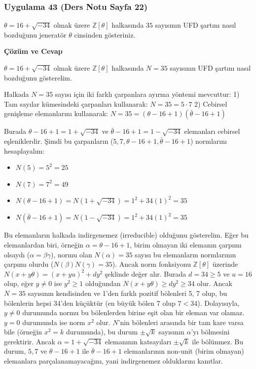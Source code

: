 \documentclass[11pt, a4paper]{article}
\newenvironment{cozum}{
    \vspace{0.5cm}
    \noindent\textcolor{green!60!black}{\faCheckCircle\enspace \textbf{\Large Çözüm ve Cevap}}\par\vspace{0.2cm}
}{}
\begin{document}
\subsubsection{Uygulama 43 (Ders Notu Sayfa 22)}
\begin{sorubox}
$\theta = 16 + \sqrt{-34}$ olmak üzere $\mathbb{Z}[\theta]$ halkasında $35$ sayısının UFD şartını nasıl bozduğunu jeneratör $\theta$ cinsinden gösteriniz.
\end{sorubox}
\begin{cozum}
$\theta = 16 + \sqrt{-34}$ olmak üzere $\mathbb{Z}[\theta]$ halkasında $N = 35$ sayısının UFD şartını nasıl bozduğunu gösterelim.

Halkada $N = 35$ sayısı için iki farklı çarpanlara ayırma yöntemi mevcuttur:
1) Tam sayılar kümesindeki çarpanları kullanarak: $N = 35 = 5 \cdot 7$
2) Cebirsel genişleme elemanlarını kullanarak: $N = 35 = (\theta - 16 + 1)(\bar{\theta} - 16 + 1)$

Burada $\theta - 16 + 1 = 1 + \sqrt{-34}$ ve $\bar{\theta} - 16 + 1 = 1 - \sqrt{-34}$ elemanları cebirsel eşleniklerdir. Şimdi bu çarpanların ($5, 7, \theta - 16 + 1, \bar{\theta} - 16 + 1$) normlarını hesaplayalım:
\begin{itemize}
    \item $N(5) = 5^2 = 25$
    \item $N(7) = 7^2 = 49$
    \item $N(\theta - 16 + 1) = N(1 + \sqrt{-34}) = 1^2 + 34(1)^2 = 35$
    \item $N(\bar{\theta} - 16 + 1) = N(1 - \sqrt{-34}) = 1^2 + 34(1)^2 = 35$
\end{itemize}

Bu elemanların halkada indirgenemez (irreducible) olduğunu gösterelim. Eğer bu elemanlardan biri, örneğin $\alpha = \theta - 16 + 1$, birim olmayan iki elemanın çarpımı olsaydı ($\alpha = \beta \gamma$), normu olan $N(\alpha) = 35$ sayısı bu elemanların normlarının çarpımı olurdu ($N(\beta)N(\gamma) = 35$). Ancak norm fonksiyonu $\mathbb{Z}[\theta]$ üzerinde $N(x+y\theta) = (x+yu)^2 + dy^2$ şeklinde değer alır. Burada $d = 34 \ge 5$ ve $u = 16$ olup, eğer $y \neq 0$ ise $y^2 \ge 1$ olduğundan $N(x+y\theta) \ge dy^2 \ge 34$ olur. Ancak $N = 35$ sayısının kendisinden ve 1'den farklı pozitif bölenleri 5, 7 olup, bu bölenlerin hepsi $34$'den küçüktür (en büyük bölen 7 olup $7 < 34$). Dolayısıyla, $y \neq 0$ durumunda normu bu bölenlerden birine eşit olan bir eleman var olamaz. $y = 0$ durumunda ise norm $x^2$ olur. $N$'nin bölenleri arasında bir tam kare varsa bile (örneğin $x^2 = k$ durumunda), bu durum $\pm \sqrt{k}$ sayısının $\alpha$'yı bölmesini gerektirir. Ancak $\alpha = 1+\sqrt{-34}$ elemanının katsayıları $\pm \sqrt{k}$ ile bölünmez. Bu durum, $5, 7$ ve $\theta - 16 + 1$ ile $\bar{\theta} - 16 + 1$ elemanlarının non-unit (birim olmayan) elemanlara parçalanamayacağını, yani indirgenemez olduklarını kanıtlar.


\end{cozum}
\end{document}
